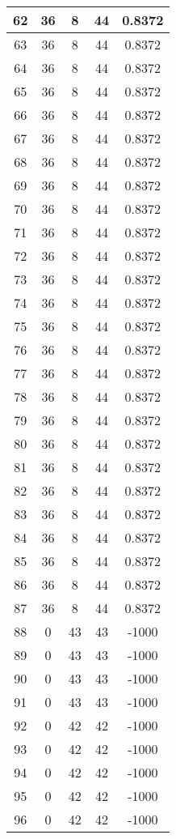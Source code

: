 \documentclass[letterpaper, 12pt]{article}
\begin{document}
\begin{longtable}{|c|c|c|c|c|}
\hline
62 & 36 & 8 & 44 & 0.8372 \\
\hline
63 & 36 & 8 & 44 & 0.8372 \\
\hline
64 & 36 & 8 & 44 & 0.8372 \\
\hline
65 & 36 & 8 & 44 & 0.8372 \\
\hline
66 & 36 & 8 & 44 & 0.8372 \\
\hline
67 & 36 & 8 & 44 & 0.8372 \\
\hline
68 & 36 & 8 & 44 & 0.8372 \\
\hline
69 & 36 & 8 & 44 & 0.8372 \\
\hline
70 & 36 & 8 & 44 & 0.8372 \\
\hline
71 & 36 & 8 & 44 & 0.8372 \\
\hline
72 & 36 & 8 & 44 & 0.8372 \\
\hline
73 & 36 & 8 & 44 & 0.8372 \\
\hline
74 & 36 & 8 & 44 & 0.8372 \\
\hline
75 & 36 & 8 & 44 & 0.8372 \\
\hline
76 & 36 & 8 & 44 & 0.8372 \\
\hline
77 & 36 & 8 & 44 & 0.8372 \\
\hline
78 & 36 & 8 & 44 & 0.8372 \\
\hline
79 & 36 & 8 & 44 & 0.8372 \\
\hline
80 & 36 & 8 & 44 & 0.8372 \\
\hline
81 & 36 & 8 & 44 & 0.8372 \\
\hline
82 & 36 & 8 & 44 & 0.8372 \\
\hline
83 & 36 & 8 & 44 & 0.8372 \\
\hline
84 & 36 & 8 & 44 & 0.8372 \\
\hline
85 & 36 & 8 & 44 & 0.8372 \\
\hline
86 & 36 & 8 & 44 & 0.8372 \\
\hline
87 & 36 & 8 & 44 & 0.8372 \\
\hline
88 & 0 & 43 & 43 & -1000 \\
\hline
89 & 0 & 43 & 43 & -1000 \\
\hline
90 & 0 & 43 & 43 & -1000 \\
\hline
91 & 0 & 43 & 43 & -1000 \\
\hline
92 & 0 & 42 & 42 & -1000 \\
\hline
93 & 0 & 42 & 42 & -1000 \\
\hline
94 & 0 & 42 & 42 & -1000 \\
\hline
95 & 0 & 42 & 42 & -1000 \\
\hline
96 & 0 & 42 & 42 & -1000 \\

\end{longtable}
\end{document}
